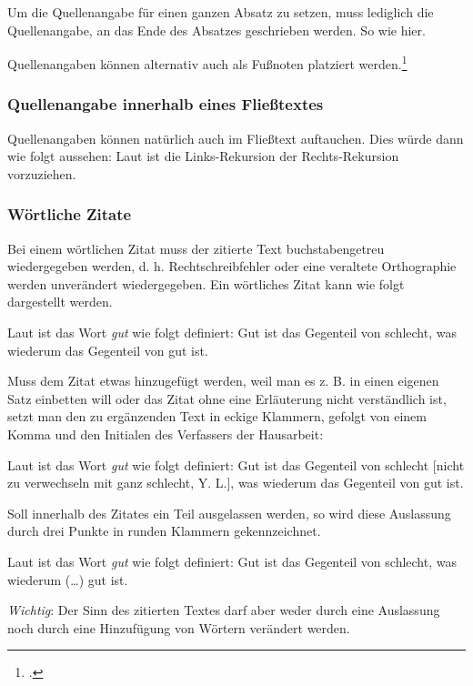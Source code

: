 Um die Quellenangabe für einen ganzen Absatz zu setzen, muss lediglich die Quellenangabe, an das Ende des Absatzes geschrieben werden. So wie hier.\\
\parencite[3-5]{angenendt}

Quellenangaben können alternativ auch als Fußnoten platziert werden.\footcite[7-14]{angenendt}


\subsubsection{Quellenangabe innerhalb eines Fließtextes}

Quellenangaben können natürlich auch im Fließtext auftauchen. Dies würde dann wie folgt aussehen: Laut \textcite[51]{angenendt} ist die Links-Rekursion der Rechts-Rekursion vorzuziehen.


\subsubsection{Wörtliche Zitate}

Bei einem wörtlichen Zitat muss der zitierte Text buchstabengetreu wiedergegeben werden, d. h. Rechtschreibfehler oder eine veraltete Orthographie werden unverändert wiedergegeben. Ein wörtliches Zitat kann wie folgt dargestellt werden.

Laut \textcite[55-56]{angenendt} ist das Wort \emph{gut} wie folgt definiert: \glqq Gut ist das Gegenteil von schlecht, was wiederum das Gegenteil von gut ist.\grqq

Muss dem Zitat etwas hinzugefügt werden, weil man es z. B. in einen eigenen Satz einbetten will oder das Zitat ohne eine Erläuterung nicht verständlich ist, setzt man den zu ergänzenden Text in eckige Klammern, gefolgt von einem Komma und den Initialen des Verfassers der Hausarbeit:

Laut \textcite[55-56]{angenendt} ist das Wort \emph{gut} wie folgt definiert: \glqq Gut ist das Gegenteil von schlecht [nicht zu verwechseln mit ganz schlecht, Y. L.], was wiederum das Gegenteil von gut ist.\grqq

Soll innerhalb des Zitates ein Teil ausgelassen werden, so wird diese Auslassung durch drei Punkte in runden Klammern gekennzeichnet.

Laut \textcite[55-56]{angenendt} ist das Wort \emph{gut} wie folgt definiert: \glqq Gut ist das Gegenteil von schlecht, was wiederum (\dots) gut ist.\grqq

\emph{Wichtig}: Der Sinn des zitierten Textes darf aber weder durch eine Auslassung noch durch eine Hinzufügung von Wörtern verändert werden.


